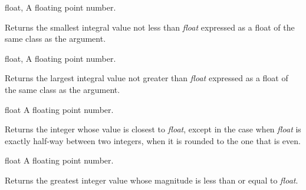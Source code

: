 \begin{optDefinition}
%
\begin{genericargs}
    \item[float, \classref{float}] A floating point number.
\end{genericargs}
%
\result%
Returns the smallest integral value not less than {\em float\/} expressed as a
float of the same class as the argument.

%
\begin{genericargs}
    \item[float, \classref{float}] A floating point number.
\end{genericargs}
%
\result%
Returns the largest integral value not greater than {\em float\/} expressed as a
float of the same class as the argument.

%
\begin{arguments}
    \item[float] A floating point number.
\end{arguments}
%
\result%
Returns the integer whose value is closest to {\em float}, except in the case
when {\em float\/} is exactly half-way between two integers, when it is rounded
to the one that is even.

%
\begin{arguments}
    \item[float] A floating point number.
\end{arguments}
%
\result%
Returns the greatest integer value whose magnitude is less than or equal to {\em
    float}.
%
\end{optDefinition}
